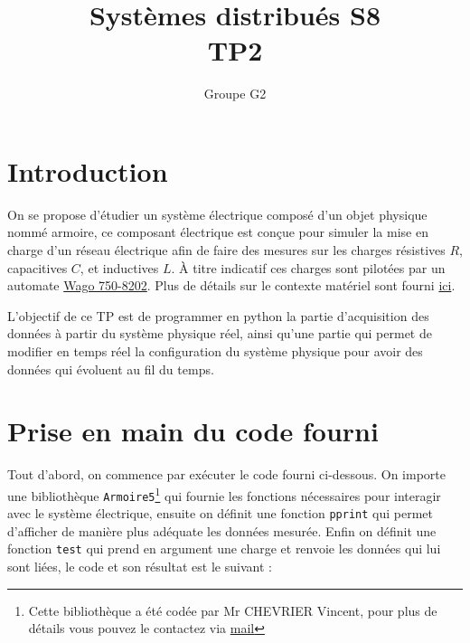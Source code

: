 \documentclass[oneside]{report}
\title{Systèmes distribués S8\\TP2}
\author{Groupe G2}
\begin{document}


\maketitle

\section{Introduction}

On se propose d'étudier un système électrique composé d'un objet physique nommé armoire, ce composant électrique est conçue pour simuler la mise en charge d'un réseau électrique afin de faire des mesures sur les charges résistives \(R\), capacitives \(C\), et inductives \(L\). À titre indicatif ces charges sont pilotées par un automate \href{https://www.wago.com/fr/contrôleur/contrôleurs-pfc200/p/750-8202}{Wago 750-8202}. Plus de détails sur le contexte matériel sont fourni \href{http://internetdesenergies.blog.univ-lorraine.fr/}{ici}.


L'objectif de ce TP est de programmer en python la partie d'acquisition des données à partir du système physique réel, ainsi qu'une partie qui permet de modifier en temps réel la configuration du système physique pour avoir des données qui évoluent au fil du temps.

\section{Prise en main du code fourni}

Tout d'abord, on commence par exécuter le code fourni ci-dessous. On importe une bibliothèque \texttt{Armoire5}\footnote{Cette bibliothèque a été codée par Mr CHEVRIER Vincent, pour plus de détails vous pouvez le contactez via \href{mailto:chevrier6@univ-lorraine.fr}{mail}} qui fournie les fonctions nécessaires pour interagir avec le système électrique, ensuite on définit une fonction \texttt{pprint} qui permet d'afficher de manière plus adéquate les données mesurée. Enfin on définit une fonction \texttt{test} qui prend en argument une charge et renvoie les données qui lui sont liées, le code et son résultat est le suivant :
\end{document}
